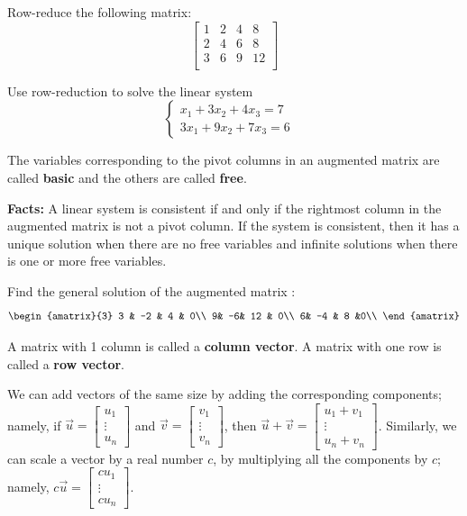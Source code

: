 \begin{enumerate}
\Problem Row-reduce the following matrix:
$$\begin{bmatrix}
1 & 2 & 4 & 8\\
2 & 4 & 6 & 8\\
3 & 6 & 9 & 12\\
\end{bmatrix}$$

\vfill 

\Problem Use row-reduction to solve the linear system
$$\begin{cases}
x_1+3x_2+4x_3 =7&\\
3x_1 +9x_2 +7x_3=6&
\end{cases}$$

\vfill

\newpage

\begin{defn}
The variables corresponding to the pivot columns in an augmented matrix are called {\bf basic} and the others are called {\bf free}.
\end{defn}




{\bf Facts:} A linear system is consistent if and only if the rightmost column in the augmented matrix is not a pivot column. If the system is consistent, then it has a unique solution when there are no free variables and infinite solutions when there is one or more free variables.

\Problem Find the general solution of the augmented matrix :
$$\begin{amatrix}{3}
3 & -2 & 4 & 0\\
9& -6& 12 & 0\\
6& -4 & 8 &0\\
\end{amatrix}$$

\newpage

\begin{defn}
A matrix with 1 column is called a {\bf column vector}. A matrix with one row is called a {\bf row vector}.
\end{defn}

We can add vectors of the same size by adding the corresponding components; namely,
if $\vec{u}=\begin{bmatrix} u_1\\ \vdots\\ u_n \end{bmatrix}$ and  $\vec{v}=\begin{bmatrix} v_1\\ \vdots\\ v_n \end{bmatrix}$, then $\vec{u}+\vec{v} =\begin{bmatrix} u_1+v_1\\ \vdots\\ u_n+v_n \end{bmatrix}$. Similarly, we can scale a vector by a real number $c$, by multiplying all the components by $c$; namely, $c\vec{u}=\begin{bmatrix} cu_1\\ \vdots\\ cu_n \end{bmatrix}$.


\end{enumerate}
